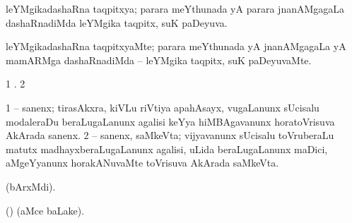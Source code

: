 {{{{{{{{{{{{{{\bentry
{} 
\gl{\gu}
\expl{}
\bmng
 leYMgikadashaRna taqpitxya; parara meYthunada yA parara jnanAMgagaLa dashaRnadiMda leYMgika taqpitx, suK paDeyuva. 
\emng
\eentry

\bentry
{} 
\gl{\kirxvi}
\expl{}
\bmng
 leYMgikadashaRna taqpitxyaMte; parara meYthunada yA jnanAMgagaLa yA mamARMga dashaRnadiMda -- leYMgika taqpitx, suK paDeyuvaMte. 
\emng
\eentry

\bentry
{}
\gl{\saMkiSx}
\expl{}
\bmng
\emng
\eentry

\bentry
{}
\gl{\saMkiSx}
\expl{\Latin }
\bmng
\bnum
\num{1}  . 
\num{2}  
\enum
\emng
\eentry

\bentry 
{}
\gl{\saMkiSx}
\expl{}
\bmng
\emng
\eentry

\bentry
{}
\gl{\saMkiSx}
\expl{}
\bmng
\emng
\eentry


\bentry
{} 
\gl{\nA}
\expl{}
\bmng
\bnum
\num{1}  -- sanenx; tirasAkxra, kiVLu riVtiya apahAsayx, \mo vugaLanunx sUcisalu modaleraDu beraLugaLanunx agalisi keYya hiMBAgavanunx horatoVrisuva  AkArada sanenx. 
\num{2}  -- sanenx, saMkeVta; vijyavanunx sUcisalu toVruberaLu matutx madhayxberaLugaLanunx agalisi, uLida beraLugaLanunx maDici, aMgeYyanunx horakANuvaMte toVrisuva  AkArada saMkeVta. 
\enum
\emng
\eentry

\bentry
{}
\gl{\saMkiSx}
\expl{}
\bmng
\emng
\eentry

\bentry
{} 
\gl{\saMkiSx}
\expl{}
\bmng
  (bArxMdi). 
\emng
\eentry

\bentry 
{}
\gl{\saMkiSx}
\expl{}
\bmng
 (\ame)  (aMce baLake). 
\emng
\eentry

\bentry
{}
\gl{\saMkiSx}
\expl{}
\bmng
\emng
\eentry

\bentry
{}
\gl{\saMkiSx}
\expl{}
\bmng
\emng
\eentry

\bentry
{} 
\gl{\saMkiSx}
\expl{}
\bmng
\emng
\eentry

}}}}}}}}}}}}}}
